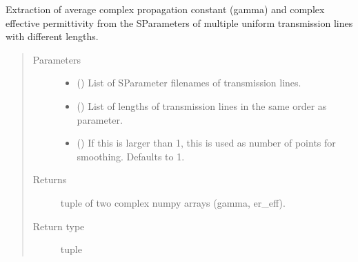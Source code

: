 \documentclass[letterpaper,10pt,english]{sphinxmanual}
\begin{document}

\begin{fulllineitems}
\label{\detokenize{touchstone:touchstone.extract_gamma_ereff_all}}
Extraction of average complex propagation constant (gamma) and complex effective permittivity from the S\sphinxhyphen{}Parameters of multiple uniform transmission lines with different lengths.
\begin{quote}\begin{description}
\item[{Parameters}] \leavevmode\begin{itemize}
\item {} 
 () \textendash{} List of S\sphinxhyphen{}Parameter filenames of transmission lines.

\item {} 
 () \textendash{} List of lengths of transmission lines in the same order as  parameter.

\item {} 
 (\sphinxstyleliteralemphasis{\sphinxupquote{, }}) \textendash{} If this is larger than 1, this is used as number of points for smoothing. Defaults to 1.

\end{itemize}

\item[{Returns}] \leavevmode
tuple of two complex numpy arrays (gamma, er\_eff).

\item[{Return type}] \leavevmode
tuple

\end{description}\end{quote}

\end{fulllineitems}

\end{document}
